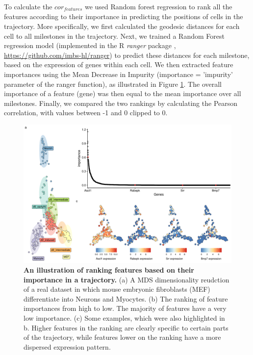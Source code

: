 To calculate the $\textit{cor}_{\textit{features}}$ we used Random forest regression to rank all the features according to their importance in predicting the positions of cells in the trajectory. More specifically, we first calculated the geodesic distances for each cell to all milestones in the trajectory. Next, we trained a Random Forest regression model (implemented in the R \textit{ranger} package \cite{wright_rangerfastimplementation_2017}, \href{https://github.com/imbs-hl/ranger}{https://github.com/imbs-hl/ranger}) to predict these distances for each milestone, based on the expression of genes within each cell. We then extracted feature importances using the Mean Decrease in Impurity (importance = 'impurity' parameter of the ranger function), as illustrated in Figure \ref{fig:snote1fig_8}. The overall importance of a feature (gene) was then equal to the mean importance over all milestones. Finally, we compared the two rankings by calculating the Pearson correlation, with values between -1 and 0 clipped to 0.

\begin{figure}[htb!]
	\centering\includegraphics[width=\linewidth]{fig/snote1fig_8.pdf}
	\caption{
		\textbf{An illustration of ranking features based on their importance in a trajectory.} 
		(a) A MDS dimensionality reudction of a real dataset in which mouse embryonic fibroblasts (MEF) differentiate into Neurons and Myocytes. (b) The ranking of feature importances from high to low. The majority of features have a very low importance. (c) Some examples, which were also highlighted in b. Higher features in the ranking are clearly specific to certain parts of the trajectory, while features lower on the ranking have a more dispersed expression pattern.
	}
	\label{fig:snote1fig_8}
\end{figure}

